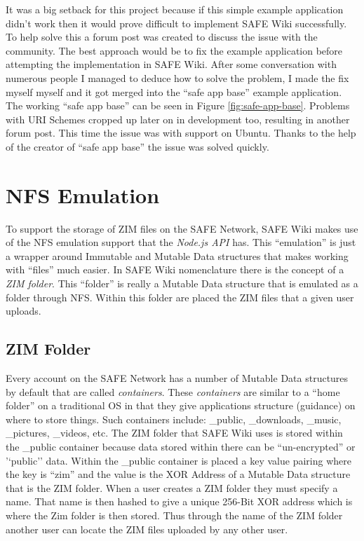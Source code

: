 It was a big setback for this project because if this simple example application didn't work then it would prove difficult to implement SAFE Wiki successfully. To help solve this a forum post\cite{safe-app-base-forummacfix} was created to discuss the issue with the community. The best approach would be to fix the example application before attempting the implementation in SAFE Wiki. After some conversation with numerous people I managed to deduce how to solve the problem, I made the fix myself myself\cite{safe-app-base-fix} and it got merged into the ``safe app base'' example application. The working ``safe app base'' can be seen in Figure \ref{fig:safe-app-base}. Problems with URI Schemes cropped up later on in development too, resulting in another forum post\cite{uri-scheme-ubuntu}. This time the issue was with support on Ubuntu. Thanks to the help of the creator of ``safe app base'' the issue was solved quickly.

\section{NFS Emulation}

To support the storage of ZIM files on the SAFE Network, SAFE Wiki makes use of the NFS emulation support that the \textit{Node.js API} has. This ``emulation'' is just a wrapper around Immutable and Mutable Data structures that makes working with ``files'' much easier. In SAFE Wiki nomenclature there is the concept of a \textit{ZIM folder}. This ``folder'' is really a Mutable Data structure that is emulated as a folder through NFS. Within this folder are placed the ZIM files that a given user uploads.

\subsection{ZIM Folder}

Every account on the SAFE Network has a number of Mutable Data structures by default that are called \textit{containers}. These \textit{containers} are similar to a ``home folder'' on a traditional OS in that they give applications structure (guidance) on where to store things. Such containers include: \_public, \_downloads, \_music, \_pictures, \_videos, etc. The ZIM folder that SAFE Wiki uses is stored within the \_public container because data stored within there can be ``un-encrypted'' or '`public'' data. Within the \_public container is placed a key value pairing where the key is ``zim'' and the value is the XOR Address of a Mutable Data structure that is the ZIM folder. When a user creates a ZIM folder they must specify a name. That name is then hashed to give a unique 256-Bit XOR address which is where the Zim folder is then stored. Thus through the name of the ZIM folder another user can locate the ZIM files uploaded by any other user.

